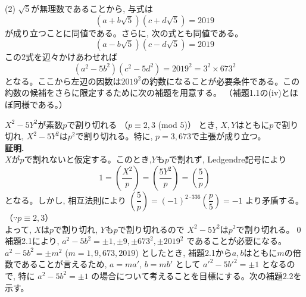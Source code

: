 (2)  $\sqrt{5}$が無理数であることから, 与式は
\[(a+b\sqrt{5})(c+d\sqrt{5})=2019\]
が成り立つことに同値である。さらに, 次の式とも同値である。
\[(a-b\sqrt{5})(c-d\sqrt{5})=2019\]
この2式を辺々かけあわせれば
\[(a^2-5b^2)(c^2-5d^2)=2019^2=3^2\times 673^2\]
となる。ここから左辺の因数は$2019^2$の約数になることが必要条件である。この約数の候補をさらに限定するために次の補題を用意する。 （補題1.1の(iv)とほぼ同様である。）

$X^2-5Y^2$が素数$p$で割り切れる （$p\equiv 2,3$ (mod $5$)） とき, $X,Y$はともに$p$で割り切れ, $X^2-5Y^2$は$p^2$で割り切れる。特に, $p=3,673$で主張が成り立つ。
\enthm
\\
{\bf 証明.}\\
$X$が$p$で割れないと仮定する。このとき,$Y$も$p$で割れず, Ledgendre記号により
\[1=\left(\dfrac{X^2}{p}\right)=\left(\dfrac{5Y^2}{p}\right)=\left(\dfrac{5}{p}\right)\]
となる。しかし, 相互法則により $\left(\dfrac{5}{p}\right)=(-1)^{2\cdot 336}\left(\dfrac{p}{5}\right)=-1$ より矛盾する。（$\because p\equiv 2,3$）\\
よって, $X$は$p$で割り切れ, $Y$も$p$で割り切れるので $X^2-5Y^2$は$p^2$で割り切れる。\qed
\\

補題2.1により, $a^2-5b^2=\pm 1, \pm 9, \pm 673^2, \pm 2019^2$ であることが必要になる。$a^2-5b^2=\pm m^2$ ($m=1,9,673,2019$) としたとき, 補題2.1から$a,b$はともに$m$の倍数であることが言えるため, $a=ma'$, $b=mb'$ として $a'^2-5b'^2=\pm 1$ となるので, 特に $a^2-5b^2=\pm 1$ の場合について考えることを目標にする。次の補題2.2を示す。



